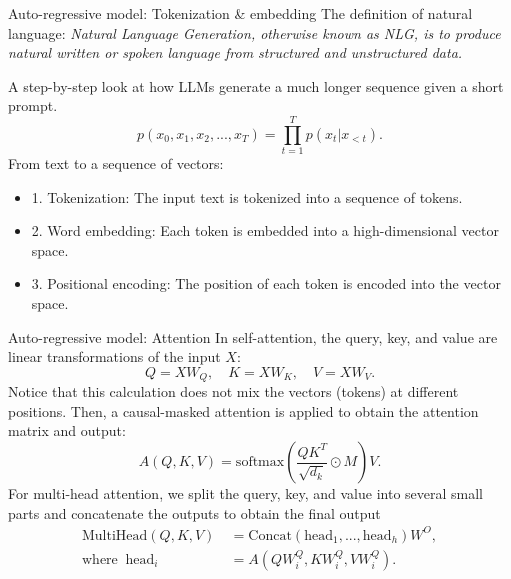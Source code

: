 \documentclass{beamer}
\begin{document}
\begin{frame}{Auto-regressive model: Tokenization \& embedding}
	The definition of natural language: \textit{Natural Language Generation, otherwise known as NLG, 
	is to produce natural written or spoken language from structured and unstructured data.}

	A step-by-step look at how LLMs generate a much longer sequence given a short prompt.
	\begin{equation}
		p(x_0, x_1, x_2, ..., x_T) = \prod_{t=1}^T p(x_t|x_{<t}).
	\end{equation}
	From text to a sequence of vectors:
	\begin{itemize}
		\item 1. Tokenization: The input text is tokenized into a sequence of tokens.
		\item 2. Word embedding: Each token is embedded into a high-dimensional vector space.
		\item 3. Positional encoding: The position of each token is encoded into the vector space.
	\end{itemize}
\end{frame}

\begin{frame}{Auto-regressive model: Attention}
	In self-attention, the query, key, and value are linear transformations of the input $X$:
	\begin{equation}
		Q = X W_Q, \quad K = XW_K, \quad V = XW_V.
	\end{equation}
	Notice that this calculation does not mix the vectors (tokens) at different positions. Then, a causal-masked
	attention is applied to obtain the attention matrix and output:
	\begin{equation}
		A(Q,K,V) = \text{softmax}(\frac{QK^T}{\sqrt{d_k}} \odot M)V.
	\end{equation}
	For multi-head attention, we split the query, key, and value into several small parts and 
	concatenate the outputs to obtain the final output
	\begin{equation}
		\begin{aligned}
			\text{MultiHead}(Q, K, V) & \ = \text{Concat}(\text{head}_1, ..., \text{head}_h)W^O,		\\
				\text{where } \ \text{head}_i & \ = A(QW_i^Q,KW_i^Q,VW_i^Q).
		\end{aligned}
	\end{equation}
\end{frame}
\end{document}
